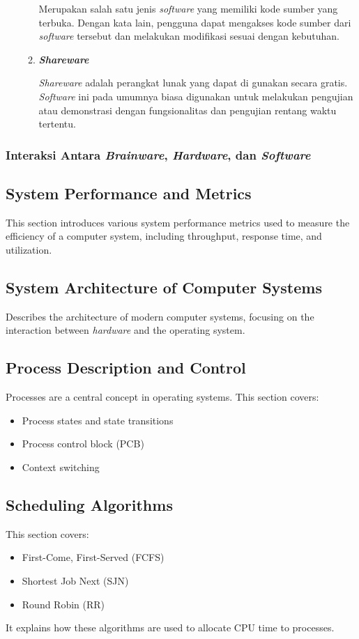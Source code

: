 \documentclass[12pt]{article}
\begin{document}
\begin{itemize}
\begin{enumerate}
            \par
            Merupakan salah satu jenis \textit{software} yang memiliki kode sumber yang terbuka. Dengan kata lain, pengguna dapat mengakses kode sumber dari \textit{software} tersebut dan melakukan modifikasi sesuai dengan kebutuhan.\cite{IDCloudHost}
            \item \textbf{\textit{Shareware}}
            \par
            \textit{Shareware} adalah perangkat lunak yang dapat di gunakan secara gratis. \textit{Software} ini pada umumnya biasa digunakan untuk melakukan pengujian atau demonstrasi dengan fungsionalitas dan pengujian rentang waktu tertentu.\cite{Gramedia}
        \end{enumerate}
    \end{itemize}
\subsubsection{Interaksi Antara \textit{Brainware}, \textit{Hardware}, dan \textit{Software}}
\subsection{System Performance and Metrics}
This section introduces various system performance metrics used to measure the efficiency of a computer system, including throughput, response time, and utilization.

\subsection{System Architecture of Computer Systems}
Describes the architecture of modern computer systems, focusing on the interaction between \textit{hardware} and the operating system.

\subsection{Process Description and Control}
Processes are a central concept in operating systems. This section covers:
\begin{itemize}
    \item Process states and state transitions
    \item Process control block (PCB)
    \item Context switching
\end{itemize}

\subsection{Scheduling Algorithms}
This section covers:
\begin{itemize}
    \item First-Come, First-Served (FCFS)
    \item Shortest Job Next (SJN)
    \item Round Robin (RR)
\end{itemize}
It explains how these algorithms are used to allocate CPU time to processes.
\end{document}
